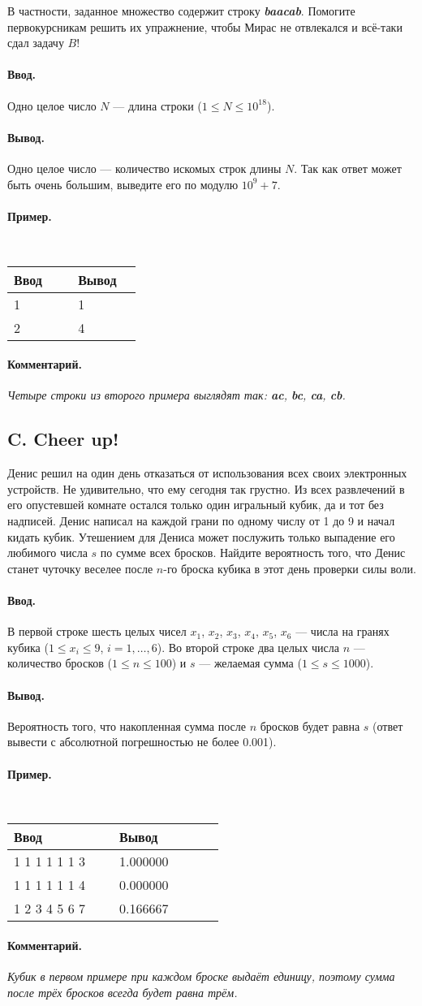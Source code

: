 \documentclass[12pt, a4paper]{article}
\newcommand{\informat}[1]
{
	\paragraph{Ввод.\\} #1
}
\newcommand{\outformat}[1]
{
	\paragraph{Вывод.\\} #1
}
\newcommand{\examplee}[4]
{
	\paragraph{Пример.\\}
	{\tt
	\begin{tabular}{|p{0.4\linewidth}|p{0.4\linewidth}|}
	\hline
	Ввод 	& Вывод  	\\
	\hline
	#1 		& #2 		\\
	\hline
	#3		& #4		\\
	\hline
	\end{tabular}
	}
}
\newcommand{\exampleee}[6]
{
	\paragraph{Пример.\\}
	{\tt
	\begin{tabular}{|p{0.4\linewidth}|p{0.4\linewidth}|}
	\hline
	Ввод 	& Вывод  	\\
	\hline
	#1 		& #2 		\\
	\hline
	#3		& #4		\\
	\hline
	#5		& #6		\\
	\hline
	\end{tabular}
	}
}
\newcommand{\excomm}[1]
{
	\paragraph{Комментарий. \\}
	\textit{#1}
}
\begin{document}
В частности, заданное множество содержит строку \textit{\textbf{baacab}}. Помогите первокурсникам решить их упражнение, чтобы Мирас не отвлекался и всё-таки сдал задачу $B$!

\informat{Одно целое число $N$ --- длина строки ($1 \le N \le {10}^{18}$).}

\outformat{Одно целое число --- количество искомых строк длины $N$. Так как ответ может быть очень большим, выведите его по модулю $10^9+7$.}

\examplee{1}{1}{2}{4}

\excomm{Четыре строки из второго примера выглядят так: \textit{\textbf{ac}}, \textit{\textbf{bc}}, \textit{\textbf{ca}}, \textit{\textbf{cb}}.}



\subsection*{C. Cheer up!}

Денис решил на один день отказаться от использования всех своих электронных устройств. Не удивительно, что ему сегодня так грустно. Из всех развлечений в его опустевшей комнате остался только один игральный кубик, да и тот без надписей. Денис написал на каждой грани по одному числу от 1 до 9 и начал кидать кубик. Утешением для Дениса может послужить только выпадение его любимого числа $s$ по сумме всех бросков. Найдите вероятность того, что Денис станет чуточку веселее после $n$-го броска кубика в этот день проверки силы воли.

\informat{В первой строке шесть целых чисел $x_1$, $x_2$, $x_3$, $x_4$, $x_5$, $x_6$ --- числа на гранях кубика ($1 \le x_i \le 9$, $i = 1, \dots, 6$). Во второй строке два целых числа $n$ --- количество бросков ($1 \le n \le 100$) и $s$ --- желаемая сумма ($1 \le s \le 1000$).}

\outformat{Вероятность того, что накопленная сумма после $n$ бросков будет равна $s$ (ответ вывести с абсолютной погрешностью не более 0.001).}

\exampleee{1 1 1 1 1 1 \newline 3 3}{1.000000}{1 1 1 1 1 1 \newline 3 4}{0.000000}{1 2 3 4 5 6 \newline 2 7}{0.166667}

\excomm{Кубик в первом примере при каждом броске выдаёт единицу, поэтому сумма после трёх бросков всегда будет равна трём.}
\end{document}
